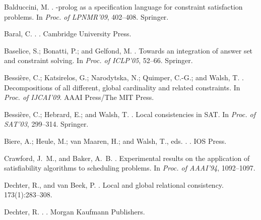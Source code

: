 \documentclass[letterpaper]{article}
\begin{document}
\begin{thebibliography}{}

Balduccini, M.
.
-prolog as a specification language for constraint satisfaction
  problems.
\newblock In {\em Proc. of LPNMR'09},  402--408.
\newblock Springer.

Baral, C.
.
.
\newblock Cambridge University Press.

Baselice, S.; Bonatti, P.; and Gelfond, M.
.
\newblock Towards an integration of answer set and constraint solving.
\newblock In {\em Proc. of ICLP'05},  52--66.
\newblock Springer.

Bessi{\`e}re, C.; Katsirelos, G.; Narodytska, N.; Quimper, C.-G.; and Walsh, T.
.
\newblock Decompositions of all different, global cardinality and related
  constraints.
\newblock In {\em Proc. of IJCAI'09}.
\newblock AAAI Press/The MIT Press.

Bessi{\`e}re, C.; Hebrard, E.; and Walsh, T.
.
\newblock Local consistencies in {SAT}.
\newblock In {\em Proc. of SAT'03},  299--314.
\newblock Springer.

Biere, A.; Heule, M.; {van Maaren}, H.; and Walsh, T., eds.
.
.
\newblock IOS Press.

Crawford, J.~M., and Baker, A.~B.
.
\newblock Experimental results on the application of satisfiability algorithms
  to scheduling problems.
\newblock In {\em Proc. of AAAI'94},  1092--1097.

Dechter, R., and {van Beek}, P.
.
\newblock Local and global relational consistency.
 173(1):283--308.

Dechter, R.
.
.
\newblock Morgan Kaufmann Publishers.


\end{thebibliography}
\end{document}

